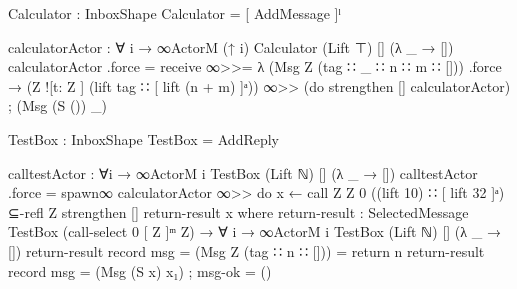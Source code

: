 \begin{code}
Calculator : InboxShape
Calculator = [ AddMessage ]ˡ

calculatorActor : ∀ {i} → ∞ActorM (↑ i) Calculator (Lift ⊤) [] (λ _ → [])
calculatorActor .force = receive ∞>>= λ {
  (Msg Z (tag ∷ _ ∷ n ∷ m ∷ [])) .force →
    (Z ![t: Z ] (lift tag ∷ [ lift (n + m) ]ᵃ)) ∞>> (do
    strengthen []
    calculatorActor)
  ; (Msg (S ()) _)
  }

TestBox : InboxShape
TestBox = AddReply

calltestActor : ∀{i} → ∞ActorM i TestBox (Lift ℕ) [] (λ _ → [])
calltestActor .force = spawn∞ calculatorActor ∞>> do
    x ← call Z Z 0
          ((lift 10) ∷ [ lift 32 ]ᵃ)
          ⊆-refl Z
    strengthen []
    return-result x
  where
    return-result : SelectedMessage {TestBox} (call-select 0 [ Z ]ᵐ Z) →
                    ∀ {i} → ∞ActorM i TestBox (Lift ℕ) [] (λ _ → [])
    return-result record { msg = (Msg Z (tag ∷ n ∷ [])) } = return n
    return-result record { msg = (Msg (S x) x₁) ; msg-ok = () }

\end{code}
